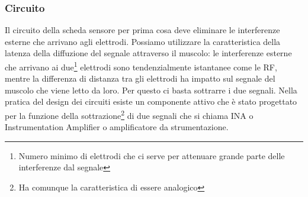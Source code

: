 \documentclass[a4paper, 10pt, final]{article} %
\begin{document}
    \subsubsection{Circuito} \label{sec:SensorBoardSchematic}
    Il circuito della scheda sensore per prima cosa deve eliminare le interferenze esterne che arrivano agli elettrodi.
    Possiamo utilizzare la caratteristica della latenza della diffuzione del segnale attraverso il muscolo: le interferenze esterne che arrivano ai due\footnote{Numero minimo di elettrodi che ci serve per attenuare grande parte delle interferenze dal segnale} elettrodi sono tendenzialmente istantanee come le RF, mentre la differenza di distanza tra gli elettrodi ha impatto sul segnale del muscolo che viene letto da loro.
    Per questo ci basta sottrarre i due segnali.
    Nella pratica del design dei circuiti esiste un componente attivo che \`{e} stato progettato per la funzione della sottrazione\footnote{Ha comunque la caratteristica di essere analogico} di due segnali che si chiama INA o Instrumentation Amplifier o amplificatore da strumentazione.
\end{document}

